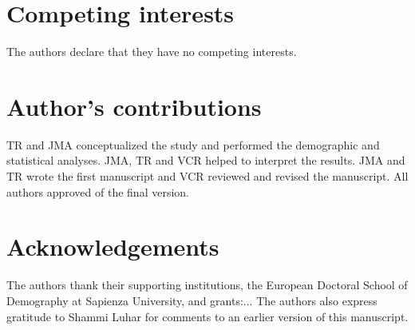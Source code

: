 \documentclass{bmcart}
\begin{document}


\begin{backmatter}

\section*{Competing interests}
  The authors declare that they have no competing interests.

\section*{Author's contributions}
TR and JMA conceptualized the study and performed the demographic and statistical analyses. JMA, TR and VCR helped to interpret the results. JMA and TR wrote the first manuscript and VCR reviewed and revised the manuscript. All authors approved of the final version.
 
\section*{Acknowledgements}
The authors thank their supporting institutions, the European Doctoral School of Demography at Sapienza University, and grants:... The authors also express gratitude to Shammi Luhar for comments to an earlier version of this manuscript.


\end{backmatter}
\end{document}
